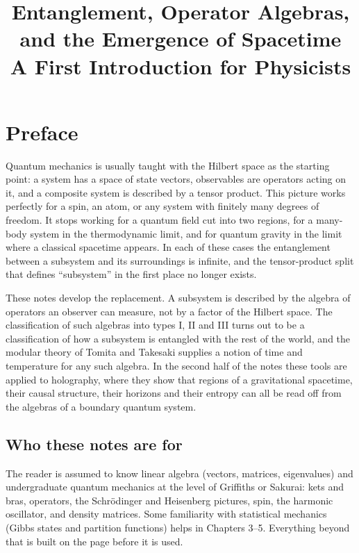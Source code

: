 \documentclass[11pt]{report}
\title{\textbf{Entanglement, Operator Algebras,\\ and the Emergence of Spacetime}\\[10pt]
\Large A First Introduction for Physicists}
\author{}
\date{}
\begin{document}
\maketitle
\thispagestyle{empty}

\chapter*{Preface}

Quantum mechanics is usually taught with the Hilbert space as the starting point: a system has a space of
state vectors, observables are operators acting on it, and a composite system is described by a tensor
product. This picture works perfectly for a spin, an atom, or any system with finitely many degrees of
freedom. It stops working for a quantum field cut into two regions, for a many-body system in the
thermodynamic limit, and for quantum gravity in the limit where a classical spacetime appears. In each of these
cases the entanglement between a subsystem and its surroundings is infinite, and the tensor-product split that
defines ``subsystem'' in the first place no longer exists.

These notes develop the replacement. A subsystem is described by the algebra of operators an observer can
measure, not by a factor of the Hilbert space. The classification of such algebras into types I, II and III
turns out to be a classification of how a subsystem is entangled with the rest of the world, and the modular
theory of Tomita and Takesaki supplies a notion of time and temperature for any such algebra. In the second
half of the notes these tools are applied to holography, where they show that regions of a gravitational
spacetime, their causal structure, their horizons and their entropy can all be read off from the algebras of
a boundary quantum system.

\section*{Who these notes are for}

The reader is assumed to know linear algebra (vectors, matrices, eigenvalues) and undergraduate quantum
mechanics at the level of Griffiths or Sakurai: kets and bras, operators, the Schr\"odinger and Heisenberg
pictures, spin, the harmonic oscillator, and density matrices. Some familiarity with statistical mechanics
(Gibbs states and partition functions) helps in Chapters 3--5. Everything beyond that is built on the page
before it is used.
\end{document}
